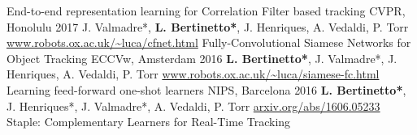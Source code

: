 


\begin{cvpapers}

  \cvpapertitle
    {End-to-end representation learning for Correlation Filter based tracking} %
    {CVPR, Honolulu} %
    {2017} %
  \cvpaperauthors
    {J. Valmadre*, \textbf{L. Bertinetto*}, J. Henriques, A. Vedaldi, P. Torr}
    {} %
    {} %
  \cvpaperurl
    {\href{http://www.robots.ox.ac.uk/~luca/cfnet.html}{www.robots.ox.ac.uk/\textasciitilde luca/cfnet.html}}
    {} %
    {} %
  \cvpapertitle
    {Fully-Convolutional Siamese Networks for Object Tracking} %
    {ECCVw, Amsterdam} %
    {2016} %
  \cvpaperauthors
    {\textbf{L. Bertinetto*}, J. Valmadre*, J. Henriques, A. Vedaldi, P. Torr}
    {} %
    {} %
  \cvpaperurl
    {\href{http://www.robots.ox.ac.uk/~luca/siamese-fc.html}{www.robots.ox.ac.uk/\textasciitilde luca/siamese-fc.html}}
    {} %
    {} %
  \cvpapertitle
    {Learning feed-forward one-shot learners} %
    {NIPS, Barcelona} %
    {2016} %
  \cvpaperauthors
    {\textbf{L. Bertinetto*}, J. Henriques*, J. Valmadre*, A. Vedaldi, P. Torr}
    {} %
    {} %
  \cvpaperurl
    {\href{http://arxiv.org/abs/1606.05233}{arxiv.org/abs/1606.05233}}
    {} %
    {} %
  \cvpapertitle
    {Staple: Complementary Learners for Real-Time Tracking} %

\end{cvpapers}
